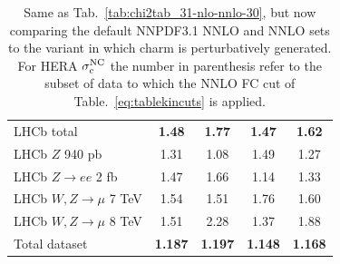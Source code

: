 \begin{table}[h]
\begin{center}
\begin{tabular}{|l|c|c||c|c|}
\hline 
LHCb total      &   {\bf 1.48}      &  {\bf 1.77 }
&  {\bf  1.47}      &   {\bf 1.62}  \\
LHCb $Z$ 940 pb      &   1.31     &   1.08 &    1.49      &   1.27  \\
LHCb $Z\to ee$ 2 fb      &   1.47     &   1.66
 &    1.14      &   1.33 \\
LHCb $W,Z \to \mu$ 7 TeV       &   1.54      &   1.51
&    1.76      &   1.60 \\
LHCb $W,Z \to \mu$ 8 TeV       &   1.51     &   2.28
 &    1.37     &   1.88 \\
\hline
\hline
Total dataset \bf     &\bf   1.187    & \bf  1.197   &  \bf  1.148      & \bf  1.168 \\
\hline
\end{tabular}
\caption{\small
\label{tab:chi2tab_31-nlo-nnlo-30-pc} 
Same as Tab.~\ref{tab:chi2tab_31-nlo-nnlo-30}, but now comparing the
default NNPDF3.1 NNLO and NNLO sets to the  variant in which charm is
perturbatively generated. For HERA $\sigma_c^{\rm NC}$ the number in
parenthesis refer to the subset of data to which the NNLO FC cut of
Table.~\ref{eq:tablekincuts} is applied.
}
\end{center}
\end{table}
